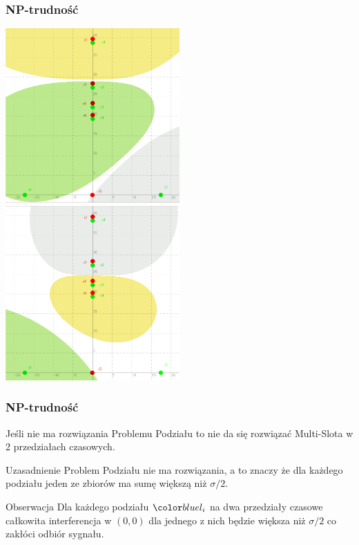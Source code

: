 \documentclass[polish, t,10pt]{beamer}
\begin{document}
\begin{frame}
    \frametitle{NP-trudność}
    \centering
    \includegraphics[width=0.5\textwidth]{pictures/np-ok1.png}
    \includegraphics[width=0.5\textwidth]{pictures/np-ok2.png}
\end{frame}
\begin{frame}
    \frametitle{NP-trudność}
    Jeśli nie ma rozwiązania Problemu Podziału to nie da się rozwiązać Multi-Slota w 2 przedziałach czasowych.
    \begin{block}{Uzasadnienie}
        Problem Podziału nie ma rozwiązania, a to znaczy że dla każdego podziału jeden ze zbiorów ma sumę większą niż $\sigma/2$.
    \end{block}
    \pause
    \begin{block}{Obserwacja}
        Dla każdego podziału $\li$ na dwa przedziały czasowe całkowita interferencja w $(0, 0)$ dla jednego z nich będzie większa niż $\sigma/2$ co zakłóci odbiór sygnału.
    \end{block}
\end{frame}
\end{document}
